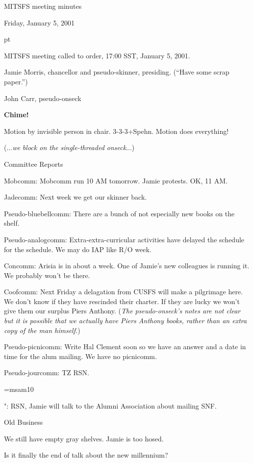 \centerline{MITSFS meeting minutes}
\centerline{Friday, January 5, 2001}

 pt

MITSFS meeting called to order, 17:00 SST, January 5, 2001.

Jamie Morris, chancellor and pseudo-skinner, presiding.  (``Have some scrap paper.'')

John Carr, pseudo-onseck

{\bf Chime!}

\vskip 12pt
Motion by invisible person in chair.  \hbox{3-3-3+Spehn}.
Motion does everything!

(...{\it we block on the single-threaded onseck}...)

\vskip 12pt

\centerline{Committee Reports}

\vskip 12pt

Mobcomm: Mobcomm run 10 AM tomorrow.  Jamie protests.  OK, 11 AM.

Jadecomm: Next week we get our skinner back.

Pseudo-bluebellcomm: There are a bunch of not especially new books
on the shelf.

Pseudo-analogcomm: Extra-extra-curricular activities have delayed
the schedule for the schedule.  We may do IAP like R/O week.

Concomm: Arisia is in about a week.  One of Jamie's new colleagues
is running it.  We probably won't be there.

Coofcomm: Next Friday a delagation from CUSFS will make a pilgrimage
here.  We don't know if they have rescinded their charter.  If they
are lucky we won't give them our surplus Piers Anthony.
({\it The pseudo-onseck's notes are not clear but it is possible that
we actually have Piers Anthony {\rm books}, rather than an extra copy
of the man himself.})

Pseudo-picnicomm: Write Hal Clement soon so we have an answer and a
date in time for the alum mailing.  We have no picnicomm.

Pseudo-jourcomm: TZ RSN.

\font\sym=msam10

{\sym "}: RSN, Jamie will talk to the Alumni Association about mailing SNF.

\vskip 12pt

\centerline{Old Business}

\vskip 12pt
We still have empty gray shelves.  Jamie is too hosed.

Is it finally the end of talk about the new millennium?

